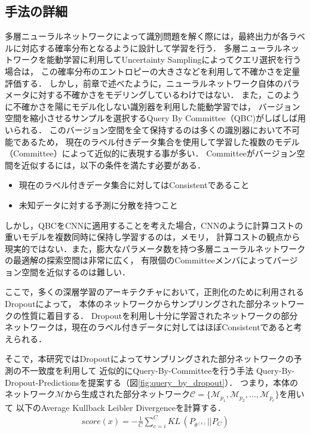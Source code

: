 \subsection{手法の詳細}
多層ニューラルネットワークによって識別問題を解く際には，最終出力が各ラベルに対応する確率分布となるように設計して学習を行う．
多層ニューラルネットワークを能動学習に利用してUncertainty Samplingによってクエリ選択を行う場合は，
この確率分布のエントロピーの大きさなどを利用して不確かさを定量評価する．
しかし，前章で述べたように，ニューラルネットワーク自体のパラメータに対する不確かさをモデリングしているわけではない．
また，このように不確かさを陽にモデル化しない識別器を利用した能動学習では，
バージョン空間を縮小させるサンプルを選択するQuery By Committee（QBC)\cite{seung1992query}がしばしば用いられる．
このバージョン空間を全て保持するのは多くの識別器において不可能であるため，
現在のラベル付きデータ集合を使用して学習した複数のモデル（Committee）によって近似的に表現する事が多い．
Committeeがバージョン空間を近似するには，以下の条件を満たす必要がある．
\begin{itemize}
\item 現在のラベル付きデータ集合に対してはConsistentであること
\item 未知データに対する予測に分散を持つこと
\end{itemize}
しかし，QBCをCNNに適用することを考えた場合，CNNのように計算コストの重いモデルを複数同時に保持し学習するのは，メモリ，
計算コストの観点から現実的ではない．また，膨大なパラメータ数を持つ多層ニューラルネットワークの最適解の探索空間は非常に広く，
有限個のCommitteeメンバによってバージョン空間を近似するのは難しい．

ここで，多くの深層学習のアーキテクチャにおいて，正則化のために利用されるDropoutによって，
本体のネットワークからサンプリングされた部分ネットワークの性質に着目する．
Dropoutを利用し十分に学習されたネットワークの部分ネットワークは，現在のラベル付きデータに対してはほぼConsistentであると考えられる．

そこで，本研究ではDropoutによってサンプリングされた部分ネットワークの予測の不一致度を利用して
近似的にQuery-By-Committeeを行う手法 Query-By-Dropout-Predictionsを提案する（図\ref{fig:query_by_dropout}）．
つまり，本体のネットワーク$\mathcal{M}$から生成された部分ネットワーク$\mathcal{C} = \{\mathcal{M}_{p_1}, \mathcal{M}_{p_2}, \dots, \mathcal{M}_{p_c} \}$を用いて
以下のAverage Kullback Leibler Divergenceを計算する．
\begin{eqnarray}
    score(x) =  -  \frac{1}{C} \sum_{c=i}^C KL \, (P_{\theta^{(c)}} || P_C)
\end{eqnarray}

